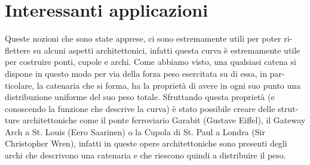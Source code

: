 \documentclass{article}
\begin{document}
\section{Interessanti applicazioni}
Queste nozioni che sono state apprese, ci sono estremamente utili per poter ri-
flettere su alcuni aspetti architettonici, infatti questa curva è estremamente utile
per costruire ponti, cupole e archi. Come abbiamo visto, una qualsiasi catena
si dispone in questo modo per via della forza peso esercitata su di essa, in par-
ticolare, la catenaria che si forma, ha la proprietà di avere in ogni suo punto
una distribuzione uniforme del suo peso totale. Sfruttando questa proprietà (e
conoscendo la funzione che descrive la curva) è stato possibile creare delle strut-
ture architettoniche come il ponte ferroviario Garabit (Gustave Eiffel), il Gateway Arch a 
St. Louis (Eero Saarinen) o la Cupola di St. Paul a Londra (Sir Christopher
Wren), infatti in queste opere architettoniche sono presenti degli archi che descrivono
una catenaria e che riescono quindi a distribuire il peso.
\end{document}
